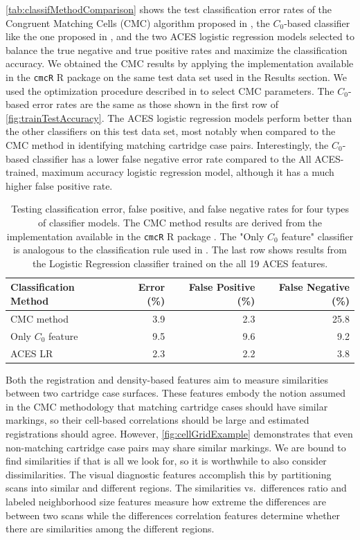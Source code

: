 \documentclass[reprint]{JASA}
\begin{document}
\autoref{tab:classifMethodComparison} shows the test classification
error rates of the Congruent Matching Cells (CMC) algorithm proposed in
\citet{song_proposed_2013}, the \(C_0\)-based classifier like the one
proposed in \citet{zhang_convergence_2021}, and the two ACES logistic
regression models selected to balance the true negative and true
positive rates and maximize the classification accuracy. We obtained the
CMC results by applying the implementation available in the
\texttt{cmcR} R package \citep{cmcR} on the same test data set used in
the Results section. We used the optimization procedure described in
\citet{Zemmels2023} to select CMC parameters. The \(C_0\)-based error
rates are the same as those shown in the first row of
\autoref{fig:trainTestAccuracy}. The ACES logistic regression models
perform better than the other classifiers on this test data set, most
notably when compared to the CMC method in identifying matching
cartridge case pairs. Interestingly, the \(C_0\)-based classifier has a
lower false negative error rate compared to the All ACES-trained,
maximum accuracy logistic regression model, although it has a much
higher false positive rate.

\begin{table}[htbp]
\centering
\begin{tabular}{l r r r}
Classification Method & Error (\%) & False Positive (\%) & False Negative (\%) \\
\hline
CMC method &  3.9 & 2.3 & 25.8 \\
Only $C_0$ feature & 9.5 & 9.6 & 9.2 \\
ACES LR & 2.3 & 2.2 & 3.8 \\
\end{tabular}
\caption{Testing classification error, false positive, and false negative rates for four types of classifier models. The CMC method results are derived from the implementation available in the \texttt{cmcR} R package \citet{cmcR}. The "Only $C_0$ feature" classifier is analogous to the classification rule used in \citet{zhang_convergence_2021}. The last row shows results from the Logistic Regression classifier trained on the all 19 ACES features.}
\label{tab:classifMethodComparison}
\end{table}

Both the registration and density-based features aim to measure
similarities between two cartridge case surfaces. These features embody
the notion assumed in the CMC methodology that matching cartridge cases
should have similar markings, so their cell-based correlations should be
large and estimated registrations should agree. However,
\autoref{fig:cellGridExample} demonstrates that even non-matching
cartridge case pairs may share similar markings. We are bound to find
similarities if that is all we look for, so it is worthwhile to also
consider dissimilarities. The visual diagnostic features accomplish this
by partitioning scans into similar and different regions. The
similarities vs.~differences ratio and labeled neighborhood size
features measure how extreme the differences are between two scans while
the differences correlation features determine whether there are
similarities among the different regions.
\end{document}
